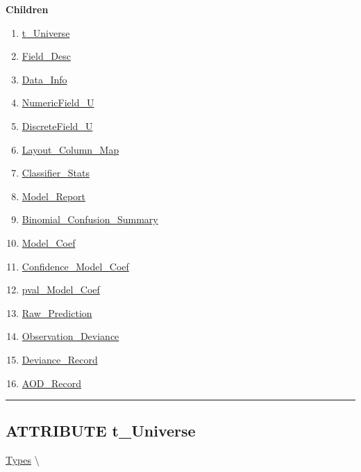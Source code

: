 \textbf{Children}
\begin{enumerate}
\item \hyperlink{ecldoc:logisticregression.types.t_universe}{t\_Universe}
\item \hyperlink{ecldoc:logisticregression.types.field_desc}{Field\_Desc}
\item \hyperlink{ecldoc:logisticregression.types.data_info}{Data\_Info}
\item \hyperlink{ecldoc:logisticregression.types.numericfield_u}{NumericField\_U}
\item \hyperlink{ecldoc:logisticregression.types.discretefield_u}{DiscreteField\_U}
\item \hyperlink{ecldoc:logisticregression.types.layout_column_map}{Layout\_Column\_Map}
\item \hyperlink{ecldoc:logisticregression.types.classifier_stats}{Classifier\_Stats}
\item \hyperlink{ecldoc:logisticregression.types.model_report}{Model\_Report}
\item \hyperlink{ecldoc:logisticregression.types.binomial_confusion_summary}{Binomial\_Confusion\_Summary}
\item \hyperlink{ecldoc:logisticregression.types.model_coef}{Model\_Coef}
\item \hyperlink{ecldoc:logisticregression.types.confidence_model_coef}{Confidence\_Model\_Coef}
\item \hyperlink{ecldoc:logisticregression.types.pval_model_coef}{pval\_Model\_Coef}
\item \hyperlink{ecldoc:logisticregression.types.raw_prediction}{Raw\_Prediction}
\item \hyperlink{ecldoc:logisticregression.types.observation_deviance}{Observation\_Deviance}
\item \hyperlink{ecldoc:logisticregression.types.deviance_record}{Deviance\_Record}
\item \hyperlink{ecldoc:logisticregression.types.aod_record}{AOD\_Record}
\end{enumerate}

\rule{\linewidth}{0.5pt}

\subsection*{\textsf{\colorbox{headtoc}{\color{white} ATTRIBUTE}
t\_Universe}}

\hypertarget{ecldoc:logisticregression.types.t_universe}{}
\hspace{0pt} \hyperlink{ecldoc:LogisticRegression.Types}{Types} \textbackslash 

